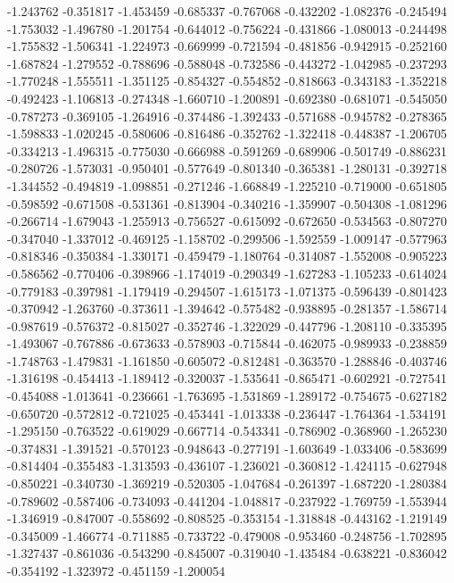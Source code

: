 -1.243762
-0.351817
-1.453459
-0.685337
-0.767068
-0.432202
-1.082376
-0.245494
-1.753032
-1.496780
-1.201754
-0.644012
-0.756224
-0.431866
-1.080013
-0.244498
-1.755832
-1.506341
-1.224973
-0.669999
-0.721594
-0.481856
-0.942915
-0.252160
-1.687824
-1.279552
-0.788696
-0.588048
-0.732586
-0.443272
-1.042985
-0.237293
-1.770248
-1.555511
-1.351125
-0.854327
-0.554852
-0.818663
-0.343183
-1.352218
-0.492423
-1.106813
-0.274348
-1.660710
-1.200891
-0.692380
-0.681071
-0.545050
-0.787273
-0.369105
-1.264916
-0.374486
-1.392433
-0.571688
-0.945782
-0.278365
-1.598833
-1.020245
-0.580606
-0.816486
-0.352762
-1.322418
-0.448387
-1.206705
-0.334213
-1.496315
-0.775030
-0.666988
-0.591269
-0.689906
-0.501749
-0.886231
-0.280726
-1.573031
-0.950401
-0.577649
-0.801340
-0.365381
-1.280131
-0.392718
-1.344552
-0.494819
-1.098851
-0.271246
-1.668849
-1.225210
-0.719000
-0.651805
-0.598592
-0.671508
-0.531361
-0.813904
-0.340216
-1.359907
-0.504308
-1.081296
-0.266714
-1.679043
-1.255913
-0.756527
-0.615092
-0.672650
-0.534563
-0.807270
-0.347040
-1.337012
-0.469125
-1.158702
-0.299506
-1.592559
-1.009147
-0.577963
-0.818346
-0.350384
-1.330171
-0.459479
-1.180764
-0.314087
-1.552008
-0.905223
-0.586562
-0.770406
-0.398966
-1.174019
-0.290349
-1.627283
-1.105233
-0.614024
-0.779183
-0.397981
-1.179419
-0.294507
-1.615173
-1.071375
-0.596439
-0.801423
-0.370942
-1.263760
-0.373611
-1.394642
-0.575482
-0.938895
-0.281357
-1.586714
-0.987619
-0.576372
-0.815027
-0.352746
-1.322029
-0.447796
-1.208110
-0.335395
-1.493067
-0.767886
-0.673633
-0.578903
-0.715844
-0.462075
-0.989933
-0.238859
-1.748763
-1.479831
-1.161850
-0.605072
-0.812481
-0.363570
-1.288846
-0.403746
-1.316198
-0.454413
-1.189412
-0.320037
-1.535641
-0.865471
-0.602921
-0.727541
-0.454088
-1.013641
-0.236661
-1.763695
-1.531869
-1.289172
-0.754675
-0.627182
-0.650720
-0.572812
-0.721025
-0.453441
-1.013338
-0.236447
-1.764364
-1.534191
-1.295150
-0.763522
-0.619029
-0.667714
-0.543341
-0.786902
-0.368960
-1.265230
-0.374831
-1.391521
-0.570123
-0.948643
-0.277191
-1.603649
-1.033406
-0.583699
-0.814404
-0.355483
-1.313593
-0.436107
-1.236021
-0.360812
-1.424115
-0.627948
-0.850221
-0.340730
-1.369219
-0.520305
-1.047684
-0.261397
-1.687220
-1.280384
-0.789602
-0.587406
-0.734093
-0.441204
-1.048817
-0.237922
-1.769759
-1.553944
-1.346919
-0.847007
-0.558692
-0.808525
-0.353154
-1.318848
-0.443162
-1.219149
-0.345009
-1.466774
-0.711885
-0.733722
-0.479008
-0.953460
-0.248756
-1.702895
-1.327437
-0.861036
-0.543290
-0.845007
-0.319040
-1.435484
-0.638221
-0.836042
-0.354192
-1.323972
-0.451159
-1.200054
